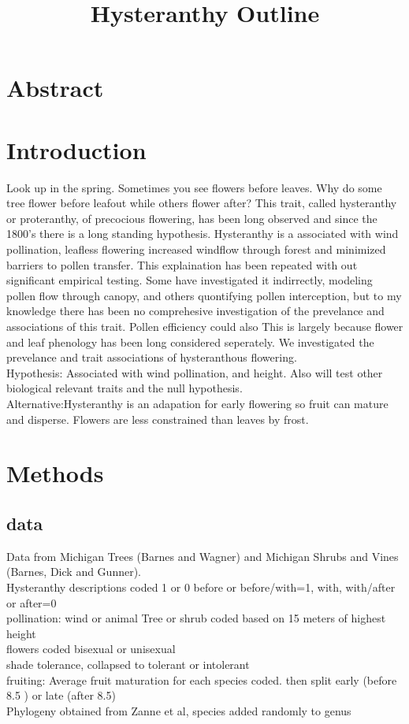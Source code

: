 \documentclass{article}\usepackage[]{graphicx}\usepackage[]{color}
\begin{document}
\title{Hysteranthy Outline}

\section{Abstract}
\section{Introduction}
Look up in the spring. Sometimes you see flowers before leaves. Why do some tree flower before leafout while others flower after? This trait, called hysteranthy or proteranthy, of precocious flowering, has been long observed and since the 1800's there is a long standing hypothesis. Hysteranthy is a associated with wind pollination, leafless flowering increased windflow through forest and minimized barriers to pollen transfer. This explaination has been repeated with out significant empirical testing. Some have investigated it indirrectly, modeling pollen flow through canopy, and others quontifying pollen interception, but to my knowledge there has been no comprehesive investigation of the prevelance and associations of this trait. Pollen efficiency could also This is largely because flower and leaf phenology has been long considered seperately. We investigated the prevelance and trait associations of hysteranthous flowering.\\
Hypothesis: Associated with wind pollination, and height. Also will test other biological relevant traits and the null hypothesis.\\
Alternative:Hysteranthy is an adapation for early flowering so fruit can mature and disperse. Flowers are less constrained than leaves by frost.

\section{Methods}
\subsection{data}
Data from Michigan Trees (Barnes and Wagner) and Michigan Shrubs and Vines (Barnes, Dick and Gunner).\\
Hysteranthy descriptions coded 1 or 0 before or before/with=1, with, with/after or after=0\\
pollination: wind or animal
Tree or shrub coded based on 15 meters of highest height\\
flowers coded bisexual or unisexual\\
shade tolerance, collapsed to tolerant or intolerant\\
fruiting: Average fruit maturation for each species coded. then split early (before 8.5 ) or late (after 8.5)\\
Phylogeny obtained from Zanne et al, species added randomly to genus
\end{document}
